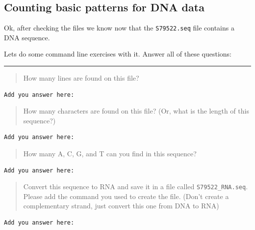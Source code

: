 \documentclass[
]{book}
\begin{document}
\hypertarget{counting-basic-patterns-for-dna-data}{%
\subsection{Counting basic patterns for DNA data}\label{counting-basic-patterns-for-dna-data}}

Ok, after checking the files we know now that the \texttt{S79522.seq} file contains a DNA sequence.

Lets do some command line exercises with it. Answer all of these questions:

\begin{center}\rule{0.5\linewidth}{0.5pt}\end{center}

\begin{quote}
How many lines are found on this file?
\end{quote}

\begin{verbatim}
Add you answer here:

\end{verbatim}

\begin{quote}
How many characters are found on this file? (Or, what is the length of this sequence?)
\end{quote}

\begin{verbatim}
Add you answer here:

\end{verbatim}

\begin{quote}
How many A, C, G, and T can you find in this sequence?
\end{quote}

\begin{verbatim}
Add you answer here:

\end{verbatim}

\begin{quote}
Convert this sequence to RNA and save it in a file called \texttt{S79522\_RNA.seq}. Please add the command you used to create the file. (Don't create a complementary strand, just convert this one from DNA to RNA)
\end{quote}

\begin{verbatim}
Add you answer here:

\end{verbatim}
\end{document}
